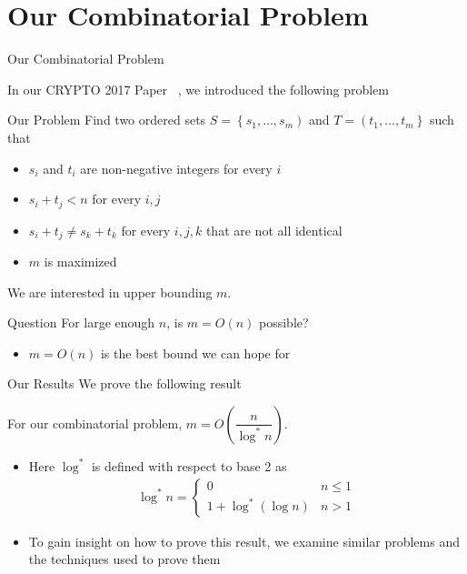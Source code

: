 \section{Our Combinatorial Problem}
\begin{frame}{Our Combinatorial Problem}

In our CRYPTO 2017 Paper ~\cite{BMN17}, we introduced the following problem

{
\begin{block}{Our Problem}
	Find two ordered sets $S = \left\lbrace s_1,\dotsc, s_m\right)$ and $T = \left(t_1,\dotsc, t_m\right\rbrace$ such that
	\begin{itemize}
		\item $s_i$ and $t_i$ are non-negative integers for every $i$
		\item $s_i + t_j < n$ for every $i,j$
		\item $s_i + t_j \neq s_k + t_k$ for every $i,j,k$ that are not all identical
		\item $m$ is maximized
	\end{itemize}
\end{block}}

We are interested in upper bounding $m$.

\begin{block}{Question}
	For large enough $n$, is $m = O(n)$ possible?
\end{block}
\begin{itemize}
	\item $m = O(n)$ is the best bound we can hope for
\end{itemize}

\end{frame}

\begin{frame}{Our Results}
	We prove the following result
	\begin{theorem}
		For our combinatorial problem, $m = O\left(\dfrac{n}{\log^*n}\right)$.
	\end{theorem}

\begin{itemize}
	\item Here $\log^*$ is defined with respect to base 2 as
	\begin{align*}
		\log^* n = \begin{cases}
			0 & n\leq 1\\
			1 + \log^*(\log n) & n > 1
		\end{cases}
	\end{align*}
	\item To gain insight on how to prove this result, we examine similar problems and the techniques used to prove them
\end{itemize}

\end{frame}

